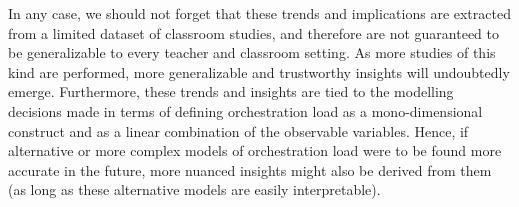 \documentclass[10pt,journal,compsoc]{IEEEtran}
\begin{document}
In any case, we should not forget that these trends and implications are extracted from a limited dataset of classroom studies, and therefore are not guaranteed to be generalizable to every teacher and classroom setting. As more studies of this kind are performed, more generalizable and trustworthy insights will undoubtedly emerge. Furthermore, these trends and insights are tied to the modelling decisions made in terms of defining orchestration load as a mono-dimensional construct and as a linear combination of the observable variables. Hence, if alternative or more complex models of orchestration load were to be found more accurate in the future, more nuanced insights might also be derived from them (as long as these alternative models are easily interpretable).

\end{document}
